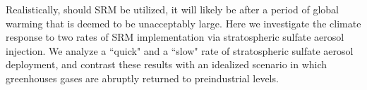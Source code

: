 \documentclass[grl]{AGUTeX}  %
\begin{document}
\begin{article}

Realistically, should SRM be utilized, it will likely be after a period of global warming that is deemed to be unacceptably large. Here we investigate the climate response to two rates of SRM implementation via stratospheric sulfate aerosol injection. We analyze a ``quick" and a ``slow" rate of stratospheric sulfate aerosol deployment, and contrast these results with an idealized scenario in which greenhouses gases are abruptly returned to preindustrial levels. %


\end{article}
\end{document}
